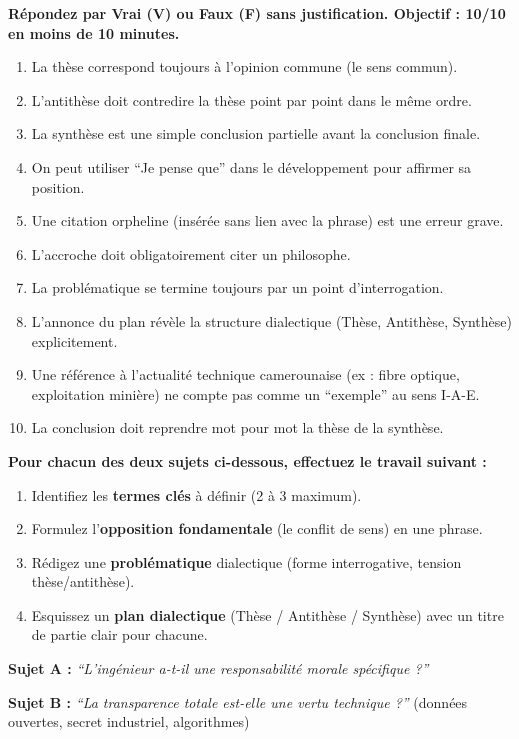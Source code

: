 \documentclass[11pt]{article}
\newcounter{popsec}
\newcounter{popsub}
\newcommand{\courssub}[1]{%
  \stepcounter{popsub}%
  \par\vspace{9pt}\noindent{\popxbold\fontsize{11.5}{13}\selectfont\color{popink}{\color{poporange}\thepopsec.\thepopsub}\hspace{6pt}#1}\par\nopagebreak\vspace{4pt}
}
\begin{document}
\begin{exercice}
\textbf{Répondez par Vrai (V) ou Faux (F) sans justification. Objectif : 10/10 en moins de 10 minutes.}
\begin{enumerate}
    \item La thèse correspond toujours à l'opinion commune (le sens commun).
    \item L'antithèse doit contredire la thèse point par point dans le même ordre.
    \item La synthèse est une simple conclusion partielle avant la conclusion finale.
    \item On peut utiliser ``Je pense que'' dans le développement pour affirmer sa position.
    \item Une citation orpheline (insérée sans lien avec la phrase) est une erreur grave.
    \item L'accroche doit obligatoirement citer un philosophe.
    \item La problématique se termine toujours par un point d'interrogation.
    \item L'annonce du plan révèle la structure dialectique (Thèse, Antithèse, Synthèse) explicitement.
    \item Une référence à l'actualité technique camerounaise (ex : fibre optique, exploitation minière) ne compte pas comme un ``exemple'' au sens I-A-E.
    \item La conclusion doit reprendre mot pour mot la thèse de la synthèse.
\end{enumerate}
\end{exercice}

\courssub{Je m'entraîne}

\begin{exercice}
\textbf{Pour chacun des deux sujets ci-dessous, effectuez le travail suivant :}
\begin{enumerate}
    \item Identifiez les \textbf{termes clés} à définir (2 à 3 maximum).
    \item Formulez l'\textbf{opposition fondamentale} (le conflit de sens) en une phrase.
    \item Rédigez une \textbf{problématique} dialectique (forme interrogative, tension thèse/antithèse).
    \item Esquissez un \textbf{plan dialectique} (Thèse / Antithèse / Synthèse) avec un titre de partie clair pour chacune.
\end{enumerate}
\textbf{Sujet A :} \emph{``L'ingénieur a-t-il une responsabilité morale spécifique ?''}

\textbf{Sujet B :} \emph{``La transparence totale est-elle une vertu technique ?''} (données ouvertes, secret industriel, algorithmes)
\end{exercice}
\end{document}
